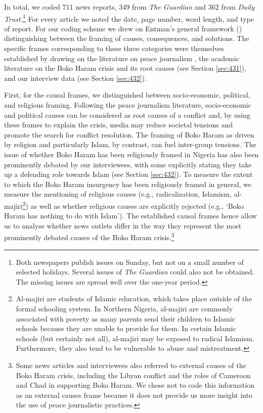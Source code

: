 In total, we coded 711 news reports, 349 from \textit{The Guardian} and 362 from \textit{Daily Trust.}\footnote{Both newspapers publish issues on Sunday, but not on a small number of selected holidays. Several issues of \textit{The Guardian} could also not be obtained. The missing issues are spread well over the one-year period.} For every article we noted the date, page number, word length, and type of report. For our coding scheme we drew on Entman's general framework (\citeyear[][p. 52]{Entman1993}) distinguishing between the framing of causes, consequences, and solutions. The specific frames corresponding to these three categories were themselves established by drawing on the literature on peace journalism \citep[e.g.,][]{Shinar2009}, the academic literature on the Boko Haram crisis and its root causes (see Section \ref{sec:431}), and our interview data (see Section \ref{sec:432}). 


First, for the causal frames, we distinguished between socio-economic, political, and religious framing. Following the peace journalism literature, socio-economic and political causes can be considered as root causes of a conflict and, by using these frames to explain the crisis, media may reduce societal tensions and promote the search for conflict resolution. The framing of Boko Haram as driven by religion and particularly Islam, by contrast, can fuel inter-group tensions. The issue of whether Boko Haram has been religiously framed in Nigeria has also been prominently debated by our interviewees, with some explicitly stating they take up a defending role towards Islam (see Section \ref{sec:432}). To measure the extent to which the Boko Haram insurgency has been religiously framed in general, we measure the mentioning of religious causes (e.g., radicalization, Islamism, al-majiri\footnote{Al-majiri are students of Islamic education, which takes place outside of the formal schooling system. In Northern Nigeria, al-majiri are commonly associated with poverty as many parents send their children to Islamic schools because they are unable to provide for them. In certain Islamic schools (but certainly not all), al-majiri may be exposed to radical Islamism. Furthermore, they also tend to be vulnerable to abuse and mistreatment.}) as well as whether religious causes are explicitly rejected (e.g., `Boko Haram has nothing to do with Islam'). The established causal frames hence allow us to analyse whether news outlets differ in the way they represent the most prominently debated causes of the Boko Haram crisis.\footnote{Some news articles and interviewees also referred to external causes of the Boko Haram crisis, including the Libyan conflict and the roles of Cameroon and Chad in supporting Boko Haram. We chose not to code this information as an external causes frame because it does not provide us more insight into the use of peace journalistic practices.}


